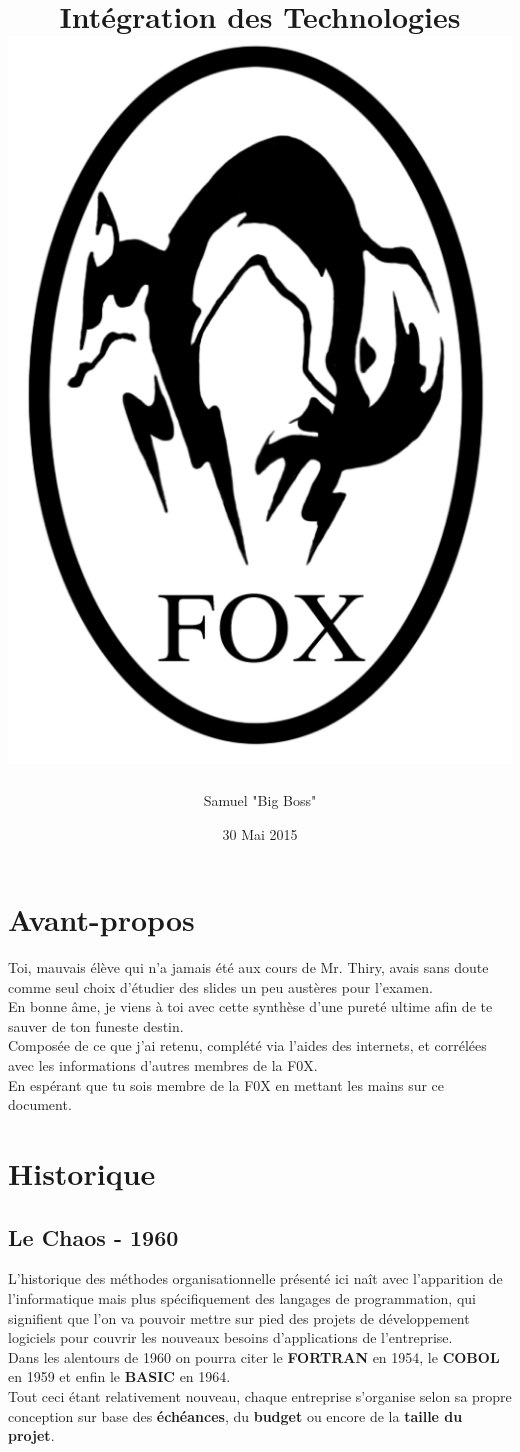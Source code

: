 \documentclass{report}
\title{Intégration des Technologies\\\includegraphics[scale=0.3]{foxhound.png}}
\author{Samuel "Big Boss" \bsc{Monroe}}
\date{30 Mai 2015}
\begin{document}
\maketitle

\newpage
\thispagestyle{empty}
\mbox{}

\tableofcontents


\chapter{Avant-propos}

	Toi, mauvais élève qui n'a jamais été aux cours de Mr. Thiry, avais sans doute comme seul choix d'étudier des slides un peu austères pour l'examen.\\

	En bonne âme, je viens à toi avec cette synthèse d'une pureté ultime afin de te sauver de ton funeste destin.\\
	Composée de ce que j'ai retenu, complété via l'aides des internets, et corrélées avec les informations d'autres membres de la F0X.\\

	En espérant que tu sois membre de la F0X en mettant les mains sur ce document.\\

\chapter{Historique}

	\section{Le Chaos - 1960}

		L'historique des méthodes organisationnelle présenté ici naît avec l'apparition de l'informatique mais plus spécifiquement des langages de programmation, qui signifient que l'on va pouvoir mettre sur pied des projets de développement logiciels pour couvrir les nouveaux besoins d'applications de l'entreprise.\\

		Dans les alentours de 1960 on pourra citer le \textbf{FORTRAN} en 1954, le \textbf{COBOL} en 1959 et enfin le \textbf{BASIC} en 1964.\\

		Tout ceci étant relativement nouveau, chaque entreprise s'organise selon sa propre conception sur base des \textbf{échéances}, du \textbf{budget} ou encore de la \textbf{taille du projet}.\\
\end{document}
